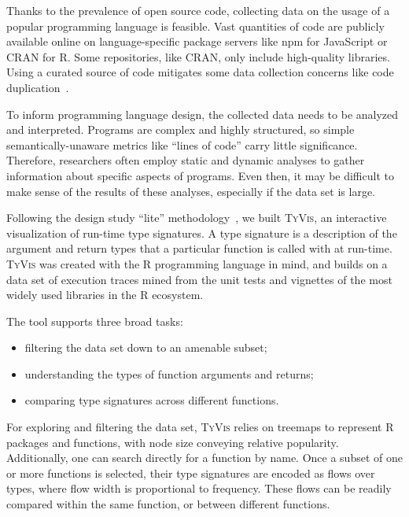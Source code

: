 \documentclass{vgtc}                          %
\newcommand{\ourmethodplaintext}{\textsc{TyVis}\xspace}
\newcommand{\ourmethod}{{\sc \ourmethodplaintext}\xspace}
\begin{document}
Thanks to the prevalence of open source code, collecting data on the usage of a popular programming language is feasible.
Vast quantities of code are publicly available online on language-specific package servers like npm for JavaScript or CRAN for R.
Some repositories, like CRAN, only include high-quality libraries.
Using a curated source of code mitigates some data collection concerns like code duplication~\cite{lopes:2017}.

To inform programming language design, the collected data needs to be analyzed and interpreted.
Programs are complex and highly structured, so simple semantically-unaware metrics like ``lines of code'' carry little significance.
Therefore, researchers often employ static and dynamic analyses to gather information about specific aspects of programs.
Even then, it may be difficult to make sense of the results of these analyses, especially if the data set is large.

Following the design study ``lite'' methodology~\cite{syeda:2020}, we built \ourmethod, an interactive visualization of run-time type signatures.
A type signature is a description of the argument and return types that a particular function is called with at run-time.
\ourmethod was created with the R programming language in mind, and builds on a data set of execution traces mined from the unit tests and vignettes of the most widely used libraries in the R ecosystem.

The tool supports three broad tasks:
\begin{itemize}
  \setlength\itemsep{0em}
  \item filtering the data set down to an amenable subset;
  \item understanding the types of function arguments and returns;
  \item comparing type signatures across different functions.
\end{itemize}

For exploring and filtering the data set, \ourmethod relies on treemaps to represent R packages and functions, with node size conveying relative popularity.
Additionally, one can search directly for a function by name.
Once a subset of one or more functions is selected, their type signatures are encoded as flows over types, where flow width is proportional to frequency.
These flows can be readily compared within the same function, or between different functions.
\end{document}
